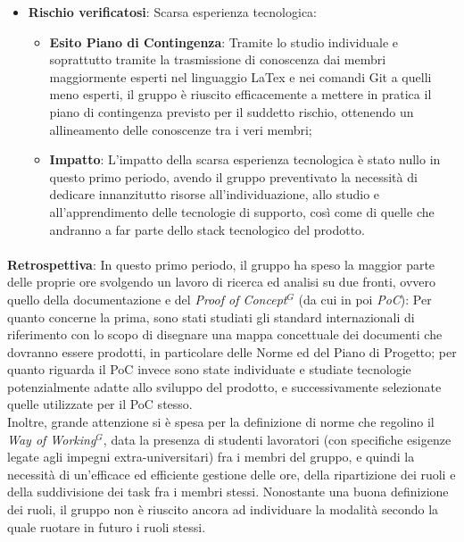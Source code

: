 \begin{itemize}
\item \textbf{Rischio verificatosi}: Scarsa esperienza tecnologica:
\begin{itemize}
\item \textbf{Esito Piano di Contingenza}: Tramite lo studio individuale e soprattutto tramite la trasmissione di conoscenza dai membri maggiormente esperti nel linguaggio LaTex e nei comandi Git a quelli meno esperti, il gruppo è riuscito efficacemente a mettere in pratica il piano di contingenza previsto per il suddetto rischio, ottenendo un allineamento delle conoscenze tra i veri membri;
\item \textbf{Impatto}: L'impatto della scarsa esperienza tecnologica è stato nullo in questo primo periodo, avendo il gruppo preventivato la necessità di dedicare innanzitutto risorse all'individuazione, allo studio e all'apprendimento delle tecnologie di supporto, così come di quelle che andranno a far parte dello stack tecnologico del prodotto.
\end{itemize}
\end{itemize}

\paragraph{}
\textbf{Retrospettiva}:
In questo primo periodo, il gruppo ha speso la maggior parte delle proprie ore svolgendo un lavoro di ricerca ed analisi
su due fronti, ovvero quello della documentazione e del \emph{Proof of Concept}$^{G}$ (da cui in poi \emph{PoC}): Per quanto concerne la prima, sono stati studiati gli standard internazionali di riferimento
con lo scopo di disegnare una mappa concettuale dei documenti che dovranno essere prodotti, in particolare delle Norme ed del Piano di Progetto; per quanto
riguarda il PoC invece sono state individuate e studiate tecnologie potenzialmente adatte allo sviluppo del prodotto, e successivamente selezionate quelle utilizzate per il PoC stesso. \\
Inoltre, grande attenzione si è spesa per la definizione di norme che regolino il \emph{Way of Working}$^{G}$, data la presenza di studenti lavoratori (con
specifiche esigenze legate agli impegni extra-universitari) fra i membri del gruppo, e quindi la necessità di un'efficace ed efficiente gestione delle ore, della ripartizione dei ruoli
e della suddivisione dei task fra i membri stessi. Nonostante una buona definizione dei ruoli, il gruppo non è riuscito ancora ad individuare la modalità secondo la quale
ruotare in futuro i ruoli stessi.


